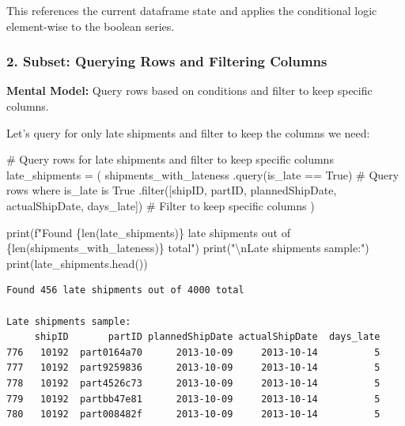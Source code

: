 \documentclass[
  letterpaper,
  DIV=11,
  numbers=noendperiod]{scrartcl}
\newenvironment{Shaded}{\begin{snugshade}}{\end{snugshade}}
\newcommand{\BuiltInTok}[1]{\textcolor[rgb]{0.00,0.23,0.31}{#1}}
\newcommand{\CharTok}[1]{\textcolor[rgb]{0.13,0.47,0.30}{#1}}
\newcommand{\CommentTok}[1]{\textcolor[rgb]{0.37,0.37,0.37}{#1}}
\newcommand{\NormalTok}[1]{\textcolor[rgb]{0.00,0.23,0.31}{#1}}
\newcommand{\OperatorTok}[1]{\textcolor[rgb]{0.37,0.37,0.37}{#1}}
\newcommand{\SpecialCharTok}[1]{\textcolor[rgb]{0.37,0.37,0.37}{#1}}
\newcommand{\SpecialStringTok}[1]{\textcolor[rgb]{0.13,0.47,0.30}{#1}}
\newcommand{\StringTok}[1]{\textcolor[rgb]{0.13,0.47,0.30}{#1}}
\begin{document}
This references the current dataframe state and applies the conditional
logic element-wise to the boolean series.

\subsubsection{2. Subset: Querying Rows and Filtering
Columns}\label{subset-querying-rows-and-filtering-columns}

\textbf{Mental Model:} Query rows based on conditions and filter to keep
specific columns.

Let's query for only late shipments and filter to keep the columns we
need:

\label{mental-model-2-subset}
\begin{Shaded}
\begin{Highlighting}[]
\CommentTok{\# Query rows for late shipments and filter to keep specific columns}
\NormalTok{late\_shipments }\OperatorTok{=}\NormalTok{ (}
\NormalTok{    shipments\_with\_lateness}
\NormalTok{    .query(}\StringTok{\textquotesingle{}is\_late == True\textquotesingle{}}\NormalTok{)  }\CommentTok{\# Query rows where is\_late is True}
\NormalTok{    .}\BuiltInTok{filter}\NormalTok{([}\StringTok{\textquotesingle{}shipID\textquotesingle{}}\NormalTok{, }\StringTok{\textquotesingle{}partID\textquotesingle{}}\NormalTok{, }\StringTok{\textquotesingle{}plannedShipDate\textquotesingle{}}\NormalTok{, }\StringTok{\textquotesingle{}actualShipDate\textquotesingle{}}\NormalTok{, }\StringTok{\textquotesingle{}days\_late\textquotesingle{}}\NormalTok{])  }\CommentTok{\# Filter to keep specific columns}
\NormalTok{)}

\BuiltInTok{print}\NormalTok{(}\SpecialStringTok{f"Found }\SpecialCharTok{\{}\BuiltInTok{len}\NormalTok{(late\_shipments)}\SpecialCharTok{\}}\SpecialStringTok{ late shipments out of }\SpecialCharTok{\{}\BuiltInTok{len}\NormalTok{(shipments\_with\_lateness)}\SpecialCharTok{\}}\SpecialStringTok{ total"}\NormalTok{)}
\BuiltInTok{print}\NormalTok{(}\StringTok{"}\CharTok{\textbackslash{}n}\StringTok{Late shipments sample:"}\NormalTok{)}
\BuiltInTok{print}\NormalTok{(late\_shipments.head())}
\end{Highlighting}
\end{Shaded}

\begin{verbatim}
Found 456 late shipments out of 4000 total

Late shipments sample:
     shipID       partID plannedShipDate actualShipDate  days_late
776   10192  part0164a70      2013-10-09     2013-10-14          5
777   10192  part9259836      2013-10-09     2013-10-14          5
778   10192  part4526c73      2013-10-09     2013-10-14          5
779   10192  partbb47e81      2013-10-09     2013-10-14          5
780   10192  part008482f      2013-10-09     2013-10-14          5
\end{verbatim}
\end{document}
